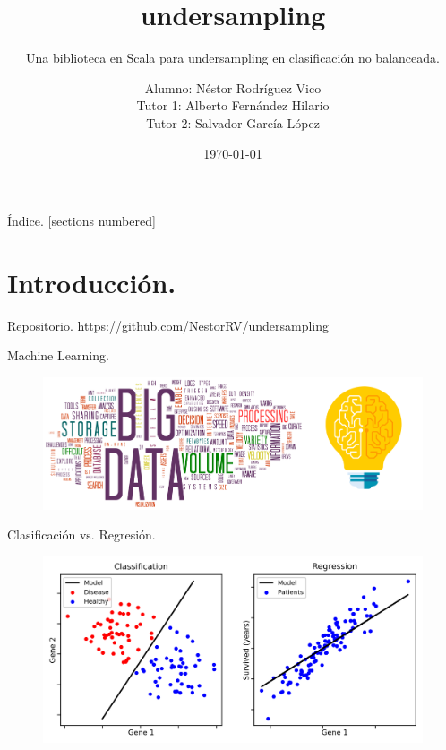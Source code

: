 \documentclass[10pt]{beamer}
\title{undersampling}
\subtitle{Una biblioteca en Scala para undersampling en clasificación no balanceada.}
\date{\today}
\author{Alumno: Néstor Rodríguez Vico \\Tutor 1: Alberto Fernández Hilario\\Tutor 2: Salvador García López}
\institute{Universidad de Granada}
\begin{document}
\maketitle

\begin{frame}{Índice.}
  [sections numbered]
  \tableofcontents[hideallsubsections]
\end{frame}

\section{Introducción.}

\begin{frame}[fragile]{Repositorio.}
\LARGE{\href{https://github.com/NestorRV/undersampling}{https://github.com/NestorRV/undersampling}}
\end{frame}

\begin{frame}[fragile]{Machine Learning.}
	\begin{figure}[H]
	\centering
	\includegraphics[width=\linewidth]{./imagenes/bdml}
	\end{figure}
\end{frame}

\begin{frame}[fragile]{Clasificación vs. Regresión.}
	\begin{figure}[H]
	\centering
	\includegraphics[width=\linewidth]{./imagenes/cr}
	\end{figure}
\end{frame}
\end{document}
